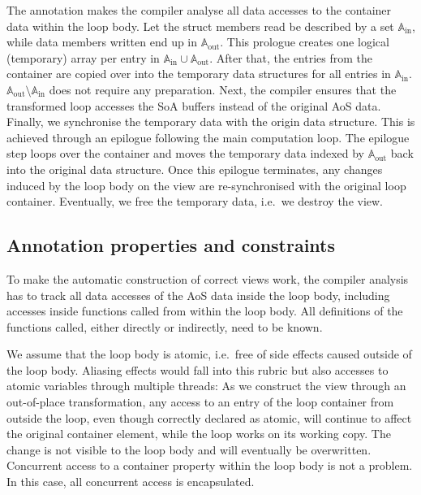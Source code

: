 The annotation makes the compiler analyse all data accesses to the container data within the loop body. 
Let the struct members read be described by a set $\mathbb{A}_{\text{in}}$,
while data members written end up in $\mathbb{A}_{\text{out}}$.
This prologue creates one logical (temporary) array per entry in $\mathbb{A}_{\text{in}} \cup \mathbb{A}_{\text{out}}$.
After that, the entries from the container are copied over into the temporary data structures for all entries in $\mathbb{A}_{\text{in}}$.
$\mathbb{A}_{\text{out}} \setminus \mathbb{A}_{\text{in}} $ does not require any preparation.
Next, the compiler ensures that the transformed loop accesses the SoA buffers instead of the original AoS data. 
Finally, we synchronise the temporary data with the origin data structure.
This is achieved through an epilogue following the main computation loop.
The epilogue step loops over the container and moves the temporary data indexed by $\mathbb{A}_{\text{out}}$ back into the original data structure.
Once this epilogue terminates, any changes induced by the loop body on the view are re-synchronised with the original loop container.
Eventually, we free the temporary data, i.e.~we destroy the view.


\subsection{Annotation properties and constraints}

To make the automatic construction of correct views work, the compiler analysis has to track all data accesses of the AoS data inside the loop body, including accesses inside functions called from within the loop body. 
All definitions of the functions called, either directly or indirectly, need to be known. 

We assume that the loop body is atomic, i.e.~free of side effects caused outside of the loop body.
Aliasing effects would fall into this rubric but also accesses to atomic variables through multiple threads:
As we construct the view through an out-of-place transformation, any access to an entry of the loop container from outside the loop, even though correctly declared as atomic, will continue to affect the original container element, while the loop works on its working copy.
The change is not visible to the loop body and will eventually be overwritten.
Concurrent access to a container property within the loop body is not a problem.
In this case, all concurrent access is encapsulated. 


